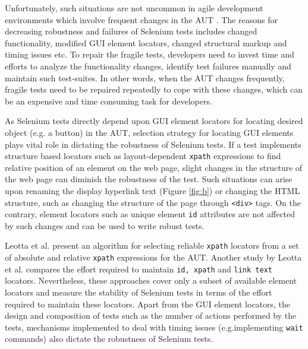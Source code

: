 Unfortunately, such situations are not uncommon in agile development environments which involve frequent changes in the AUT \cite{martin2003agile}. The reasons for decreasing robustness and failures of Selenium tests includes changed functionality, modified GUI element locators, changed structural markup and timing issues etc. To repair the fragile tests, developers need to invest time and efforts to analyze the functionality changes, identify test failures manually and maintain such test-suites. In other words, when the AUT changes frequently, fragile tests need to be repaired repeatedly to cope with these changes, which can be an expensive and time consuming task for developers. 

As Selenium tests directly depend upon GUI element locators for locating desired object (e.g. a button) in the AUT, selection strategy for locating GUI elements plays vital role in dictating the robustness of Selenium tests. If a test implements structure based locators such as layout-dependent \texttt{xpath} expressions to find relative position of an element on the web page, slight changes in the structure of the web page can diminish the robustness of the test. Such situations can arise upon renaming the display hyperlink text (Figure \ref{fig:b}) or changing the HTML structure, such as changing the structure of the page through \texttt{<div>} tags. On the contrary, element locators such as unique element \texttt{id} attributes are not affected by such changes and can be used to write robust tests. 

Leotta et al. \cite{leotta2015using} present an algorithm for selecting reliable \texttt{xpath} locators from a set of absolute and relative \texttt{xpath} expressions for the AUT. Another study by Leotta et al. \cite{leotta2013comparing} compares the effort required to maintain \texttt{id, xpath} and \texttt{link text} locators. Nevertheless, these approaches cover only a subset of available element locators and measure the stability of Selenium tests in terms of the effort required to maintain these locators. Apart from the GUI element locators, the design and composition of tests such as the number of actions performed by the tests, mechanisms implemented to deal with timing issues (e.g.\smallskip implementing \texttt{wait} commands) also dictate the robustness of Selenium tests. 


